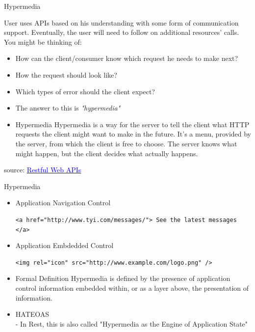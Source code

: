 \documentclass{beamer}
\newcommand{\code}[1]{\colorbox{codegray}{\texttt{#1}}}
\begin{document}
\begin{frame}[t]{Hypermedia}
		
		\scriptsize 
		User uses APIs based on his understanding with some form of communication support. Eventually, the user will need to follow on additional resources' calls. You might be thinking of:
		
		\scriptsize		
		\begin{itemize}
			\item<1-> How can the client/consumer know which request he needs to make next?
			\item<2-> How the request should look like?
			\item<3-> Which types of error should the client expect?
			
			\item<4->[] \normalsize The answer to this is \textit{"hypermedia"}
			
			\item<5->[] 
				\small
				\begin{block}{Hypermedia}
					Hypermedia is a way for the server to tell the client what HTTP requests the client might want to make in the future. It’s a menu, provided by the server, from which the client is free to choose. The server knows what might happen, but the client decides what actually happens.
				\end{block}
		\end{itemize}		

\tiny source: \href{https://www.oreilly.com/library/view/restful-web-apis/9781449359713/} {\textcolor{blue}{Restful Web APIs}} 	
\end{frame}


\begin{frame}[t, fragile]{Hypermedia}
		\scriptsize		
		\begin{itemize}
			\item<1-> Application Navigation Control \\
				\begin{semiverbatim}
					\code{<a href="http://www.tyi.com/messages/"> See the latest messages </a>}	
				\end{semiverbatim}
			
			\item<2-> Application Embdedded Control
				\begin{semiverbatim}
					\code{<img rel="icon" src="http://www.example.com/logo.png" />}
				\end{semiverbatim}
				
			\item<3->[] 
			\begin{block}{Formal Definition}
				Hypermedia is defined by the presence of application control information embedded within, or as a layer above, the presentation of information.
			\end{block}
			
			\item<4-> HATEOAS \\
				- In Rest, this is also called "Hypermedia as the Engine of Application State"
		\end{itemize}		
\end{frame}
\end{document}

